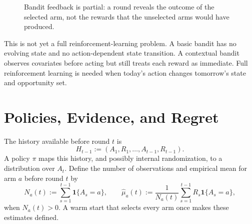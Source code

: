 \documentclass[11pt]{article}
\begin{document}
\begin{figure}[ht]
  \centering
  \caption{Bandit feedback is partial: a round reveals the outcome of the selected arm, not the rewards that the unselected arms would have produced.}
  \label{fig:bandit-loop}
\end{figure}

This is not yet a full reinforcement-learning problem. A basic bandit has no evolving state and no action-dependent state transition. A contextual bandit observes covariates before acting but still treats each reward as immediate. Full reinforcement learning is needed when today's action changes tomorrow's state and opportunity set.

\section{Policies, Evidence, and Regret}

The history available before round $t$ is
\begin{equation}
  \label{eq:history}
  H_{t-1}:=(A_1,R_1,\ldots,A_{t-1},R_{t-1}).
\end{equation}
A policy $\pi$ maps this history, and possibly internal randomization, to a distribution over $A_t$. Define the number of observations and empirical mean for arm $a$ before round $t$ by
\begin{equation}
  \label{eq:estimates}
  N_a(t):=\sum_{s=1}^{t-1}\mathbf 1\{A_s=a\},
  \qquad
  \widehat\mu_a(t):=\frac{1}{N_a(t)}
  \sum_{s=1}^{t-1}R_s\mathbf 1\{A_s=a\},
\end{equation}
when $N_a(t)>0$. A warm start that selects every arm once makes these estimates defined.
\end{document}

